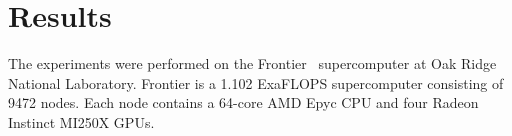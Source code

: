 \section{Results}
\label{sec:results}

The experiments were performed on the Frontier~\cite{frontier} supercomputer at Oak Ridge National Laboratory.
Frontier is a 1.102 ExaFLOPS supercomputer consisting of 9472 nodes. Each node contains a 64-core AMD Epyc CPU and four Radeon Instinct MI250X GPUs. 

